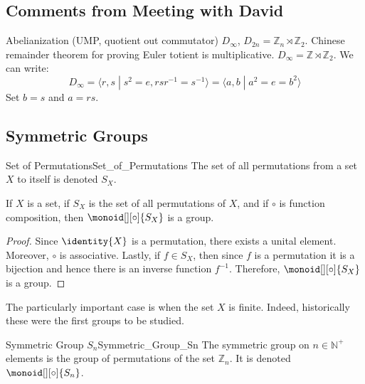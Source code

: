 \documentclass{article}                                                        %
\begin{document}
        \subsection{Comments from Meeting with David}
            Abelianization (UMP, quotient out commutator)
            $D_{\infty}$, $D_{2n}=\mathbb{Z}_{n}\rtimes\mathbb{Z}_{2}$. Chinese
            remainder theorem for proving Euler totient is multiplicative.
            $D_{\infty}=\mathbb{Z}\rtimes\mathbb{Z}_{2}$. We can write:
            \begin{equation}
                D_{\infty}=\langle{r,s}\;|\;
                    s^{2}=e,rsr^{\minus{1}}=s^{\minus{1}}\rangle
                =\langle{a,b}\;|\;a^{2}=e=b^{2}\rangle
            \end{equation}
            Set $b=s$ and $a=rs$.
        \subsection{Symmetric Groups}
            \begin{fnotation}{Set of Permutations}{Set_of_Permutations}
                The set of all permutations from a set $X$ to itself is denoted
                $S_{X}$.
            \end{fnotation}
            \begin{theorem}
                \label{thm:Symmetric_Group_is_Group}%
                If $X$ is a set, if $S_{X}$ is the set of all permutations of
                $X$, and if $\circ$ is function composition, then
                $\monoid[][\circ]{S_{X}}$ is a group.
            \end{theorem}
            \begin{proof}
                Since $\identity{X}$ is a permutation, there exists a unital
                element. Moreover, $\circ$ is associative. Lastly, if
                $f\in{S}_{X}$, then since $f$ is a permutation it is a bijection
                and hence there is an inverse function $f^{\minus{1}}$.
                Therefore, $\monoid[][\circ]{S_{X}}$ is a group.
            \end{proof}
            The particularly important case is when the set $X$ is finite.
            Indeed, historically these were the first groups to be studied.
            \begin{fdefinition}{Symmetric Group $S_{n}$}{Symmetric_Group_Sn}
                The symmetric group on $n\in\mathbb{N}^{+}$ elements is the
                group of permutations of the set $\mathbb{Z}_{n}$. It is denoted
                $\monoid[][\circ]{S_{n}}$.
            \end{fdefinition}
\end{document}
